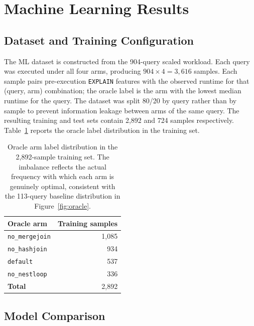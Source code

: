 \documentclass[sigconf,natbib=false]{article}
\begin{document}
\section{Machine Learning Results}
\label{sec:ml}

\subsection{Dataset and Training Configuration}
\label{sec:ml:dataset}

The ML dataset is constructed from the 904-query scaled workload. Each query was executed
under all four arms, producing $904 \times 4 = 3{,}616$ samples. Each sample pairs
pre-execution \texttt{EXPLAIN} features with the observed runtime for that (query, arm)
combination; the oracle label is the arm with the lowest median runtime for the query.
The dataset was split 80/20 by query rather than by sample to prevent information leakage
between arms of the same query. The resulting training and test sets contain 2{,}892 and
724 samples respectively. Table~\ref{tab:label_dist} reports the oracle label distribution
in the training set.

\begin{table}[ht]
  \centering
  \caption{Oracle arm label distribution in the 2{,}892-sample training set. The imbalance
  reflects the actual frequency with which each arm is genuinely optimal, consistent with
  the 113-query baseline distribution in Figure~\ref{fig:oracle}.}
  \label{tab:label_dist}
  \small
  \begin{tabular}{@{}lr@{}}
    \toprule
    \textbf{Oracle arm} & \textbf{Training samples} \\
    \midrule
    \texttt{no\_mergejoin} & 1{,}085 \\
    \texttt{no\_hashjoin}  & 934     \\
    \texttt{default}       & 537     \\
    \texttt{no\_nestloop}  & 336     \\
    \midrule
    \textbf{Total}         & 2{,}892 \\
    \bottomrule
  \end{tabular}
\end{table}

\subsection{Model Comparison}
\label{sec:ml:models}
\end{document}

